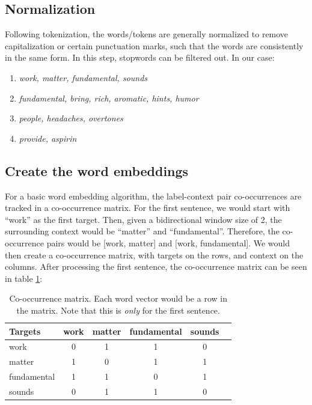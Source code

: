\subsection{Normalization}

Following tokenization, the words/tokens are generally normalized to remove capitalization or certain punctuation marks, such that the words are consistently in the same form. In this step, stopwords can be filtered out. In our case:
\begin{enumerate}
    \item \textit{work, matter, fundamental, sounds}
    \item \textit{fundamental, bring, rich, aromatic, hints, humor}
    \item \textit{people, headaches, overtones}
    \item \textit{provide, aspirin}
\end{enumerate}

\subsection{Create the word embeddings}

For a  basic word embedding algorithm, the label-context pair co-occurrences are tracked in a co-occurrence matrix. For the first sentence, we would start with ``work'' as the first target. Then, given a bidirectional window size of 2, the surrounding context would be ``matter'' and ``fundamental''. Therefore, the co-occurrence pairs would be [work, matter] and [work, fundamental]. We would then create a co-occurrence matrix, with targets on the rows, and context on the columns.  After processing the first sentence, the co-occurrence matrix can be seen in table \ref{exampleCoocmat}:

\begin{table}[h]
    \centering
    \begin{tabular}{|l|c|c|c|c|c|}
    \hline
    Targets & work & matter & fundamental & sounds \\
    \hline
    work & 0 & 1 & 1 & 0 \\
    \hline
    matter & 1 & 0 & 1 & 1  \\
    \hline
    fundamental & 1 & 1 & 0 & 1  \\
    \hline
    sounds & 0 & 1 & 1 & 0  \\
    \hline
    \end{tabular}
    \caption{Co-occurrence matrix. Each word vector would be a row in the matrix. Note that this is \textit{only} for the first sentence.}
    \label{exampleCoocmat}
\end{table}

